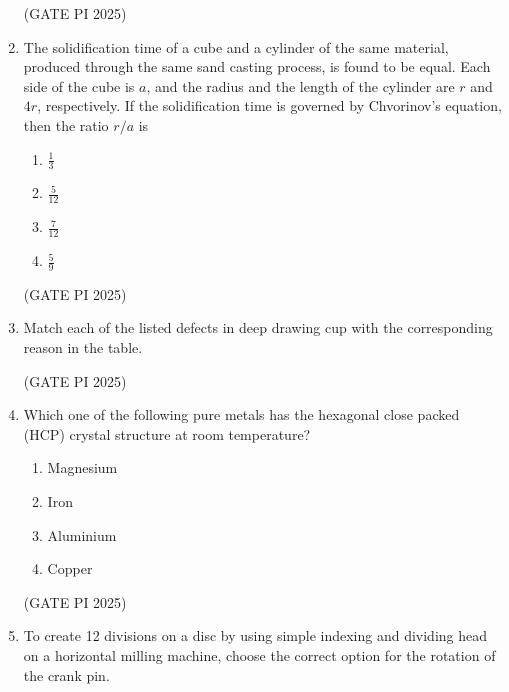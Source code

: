 \documentclass[journal,12pt,onecolumn]{IEEEtran}
\theoremstyle{remark}
\begin{document}
\begin{enumerate}
\hfill (GATE PI 2025)

\item The solidification time of a cube and a cylinder of the same material, produced through the same sand casting process, is found to be equal. Each side of the cube is $a$, and the radius and the length of the cylinder are $r$ and $4r$, respectively. If the solidification time is governed by Chvorinov's equation, then the ratio $r/a$ is

\begin{multicols}{4}
\begin{enumerate}
    \item $\frac{1}{3}$
    \item $\frac{5}{12}$
    \item $\frac{7}{12}$
    \item $\frac{5}{9}$
\end{enumerate}
\end{multicols}

\hfill (GATE PI 2025)

\item Match each of the listed defects in deep drawing cup with the corresponding reason in the table.\newline



\begin{enumerate}
\end{enumerate}

\hfill (GATE PI 2025)

\item Which one of the following pure metals has the hexagonal close packed (HCP) crystal structure at room temperature?
\begin{enumerate}
    \item Magnesium
    \item Iron
    \item Aluminium
    \item Copper
\end{enumerate}

\hfill (GATE PI 2025)

\item To create 12 divisions on a disc by using simple indexing and dividing head on a horizontal milling machine, choose the correct option for the rotation of the crank pin.


\end{enumerate}
\end{document}
